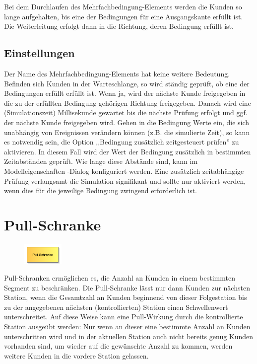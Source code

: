Bei dem Durchlaufen des Mehrfachbedingung-Elements werden die Kunden so lange aufgehalten, bis eine der Bedingungen für eine
Ausgangskante erfüllt ist. Die Weiterleitung erfolgt dann in die Richtung, deren Bedingung erfüllt ist.

\subsection*{Einstellungen}

Der Name des Mehrfachbedingung-Elements hat keine weitere Bedeutung. Befinden sich Kunden in der Warteschlange, so wird ständig geprüft,
ob eine der Bedingungen erfüllt erfüllt ist. Wenn ja, wird der nächste Kunde freigegeben in die zu der erfüllten Bedingung
gehörigen Richtung freigegeben. Danach wird eine (Simulationszeit) Millisekunde gewartet bis die nächste
Prüfung erfolgt und ggf. der nächste Kunde freigegeben wird.
Gehen in die Bedingung Werte ein, die sich unabhängig von Ereignissen verändern können (z.B. die simulierte Zeit), so kann es notwendig sein,
die Option ,,Bedingung zusätzlich zeitgesteuert prüfen'' zu aktivieren. In diesem Fall wird der Wert der Bedingung zusätzlich in bestimmten
Zeitabständen geprüft. Wie lange diese Abstände sind, kann im Modelleigenschaften -Dialog konfiguriert
werden. Eine zusätzlich zeitabhängige Prüfung verlangsamt die Simulation signifikant und sollte nur aktiviert werden, wenn dies für die
jeweilige Bedingung zwingend erforderlich ist.


\section{Pull-Schranke}
\label{ref:ModelElementBarrierPull}

\begin{figure}
\vspace{-22pt}
\includegraphics[width=2cm]{imageModelElementBarrierPull.png}
\vspace{-22pt}
\end{figure}

Pull-Schranken ermöglichen es, die Anzahl an Kunden in einem bestimmten Segment
zu beschränken. Die Pull-Schranke lässt nur dann Kunden zur nächsten Station,
wenn die Gesamtzahl an Kunden beginnend von dieser Folgestation bis zu der angegebenen
nächsten (kontrollierten) Station einen Schwellenwert unterschreitet. Auf diese Weise
kann eine Pull-Wirkung durch die kontrollierte Station ausgeübt werden: Nur wenn an
dieser eine bestimmte Anzahl an Kunden unterschritten wird und in der aktuellen Station
auch nicht bereits genug Kunden vorhanden sind, um wieder auf die gewünschte Anzahl
zu kommen, werden weitere Kunden in die vordere Station gelassen.

